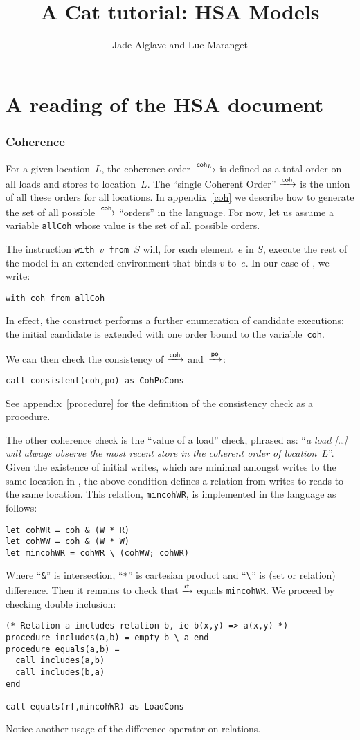 \documentclass[a4paper]{article}
\title{A Cat tutorial: HSA Models}
\date{}
\author{Jade Alglave and Luc Maranget}
\begin{document}
\maketitle
\part{A reading of the HSA document}

\section{\label{coherence}Coherence}

For a given location~$L$,
the coherence order $\xrightarrow{\textsf{\scriptsize{}coh$_{L}$}}$ is defined as a total order on all loads and
stores to location~$L$. The ``single Coherent Order'' $\xrightarrow{\textsf{\scriptsize{}coh}}$ is
the union of all these orders for all locations.
In appendix~\ref{coh} we describe how to generate the set of all possible
$\xrightarrow{\textsf{\scriptsize{}coh}}$ ``orders'' in the \cat{} language.
For now, let us assume a variable \texttt{allCoh}
whose value is the set of all possible \coh{} orders.

The instruction \texttt{with $v$ from $S$} will, for each element~$e$ in $S$,
execute the rest of the model in an extended environment that binds
$v$ to~$e$. In our case of \coh{}, we write:
\begin{verbatim}
with coh from allCoh
\end{verbatim}
In effect, the construct performs a further enumeration of candidate
executions: the initial candidate is extended with one \coh{} order
bound to the variable~\texttt{coh}.

We can then  check the consistency of $\xrightarrow{\textsf{\scriptsize{}coh}}$ and~$\xrightarrow{\textsf{\scriptsize{}po}}$:
\begin{verbatim}
call consistent(coh,po) as CohPoCons
\end{verbatim}
See appendix~\ref{procedure} for the definition of the consistency check as
a procedure.

The other coherence check is the ``value of a load'' check, phrased
as: ``\emph{a load [\ldots] will always observe the most recent store in the coherent order of location~$L$}''.
Given the existence of initial writes, which are minimal amongst writes to
the same location in \coh{}, the above condition defines a relation from
writes to reads to the same location. This relation, \texttt{mincohWR},
is implemented in the \cat{} language as follows:
\begin{verbatim}
let cohWR = coh & (W * R)
let cohWW = coh & (W * W)
let mincohWR = cohWR \ (cohWW; cohWR)
\end{verbatim}
Where ``\verb+&+'' is intersection, ``\verb+*+'' is cartesian product
and ``\verb+\+'' is (set or relation) difference.
Then it remains to check that $\xrightarrow{\textsf{\scriptsize{}rf}}$ equals \texttt{mincohWR}.
We proceed by checking double inclusion:
\begin{verbatim}
(* Relation a includes relation b, ie b(x,y) => a(x,y) *)
procedure includes(a,b) = empty b \ a end
procedure equals(a,b) =
  call includes(a,b)
  call includes(b,a)
end

call equals(rf,mincohWR) as LoadCons
\end{verbatim}
Notice another usage of the difference operator on relations.
\end{document}
